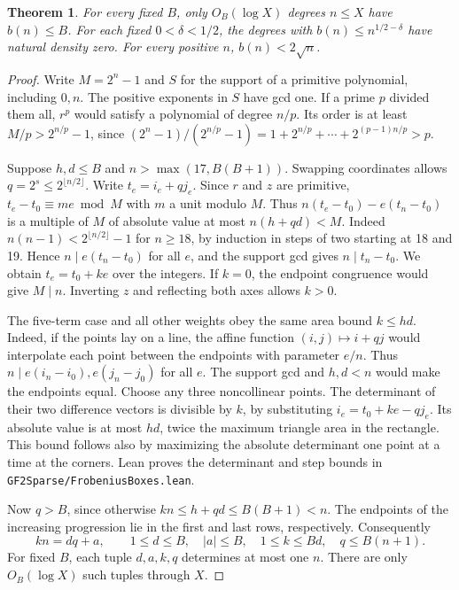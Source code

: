 \documentclass[11pt]{article}
\newtheorem{theorem}{Theorem}
\begin{document}
\begin{theorem}
For every fixed \(B\), only \(O_B(\log X)\) degrees \(n\le X\) have
\(b(n)\le B\). For each fixed \(0<\delta<1/2\), the degrees with
\(b(n)\le n^{1/2-\delta}\) have natural density zero.
For every positive \(n\), \(b(n)<2\sqrt n\).
\end{theorem}
\begin{proof}
Write \(M=2^n-1\) and \(S\) for the support of a primitive polynomial,
including \(0,n\). The positive exponents in \(S\) have gcd one. If a
prime \(p\) divided them all, \(r^p\) would satisfy a polynomial of
degree \(n/p\). Its order is at least \(M/p>2^{n/p}-1\), since
\((2^n-1)/(2^{n/p}-1)=1+2^{n/p}+\cdots+2^{(p-1)n/p}>p\).

Suppose \(h,d\le B\) and \(n>\max(17,B(B+1))\). Swapping coordinates
allows \(q=2^s\le2^{\lfloor n/2\rfloor}\). Write \(t_e=i_e+qj_e\).
Since \(r\) and \(z\) are primitive, \(t_e-t_0\equiv me\bmod M\)
with \(m\) a unit modulo \(M\). Thus \(n(t_e-t_0)-e(t_n-t_0)\)
is a multiple of \(M\) of absolute value at most \(n(h+qd)<M\).
Indeed \(n(n-1)<2^{\lfloor n/2\rfloor}-1\) for \(n\ge18\), by
induction in steps of two starting at 18 and 19. Hence
\(n\mid e(t_n-t_0)\) for all \(e\), and the support gcd gives
\(n\mid t_n-t_0\). We obtain \(t_e=t_0+ke\) over the integers.
If \(k=0\), the endpoint congruence would give \(M\mid n\).
Inverting \(z\) and reflecting both axes allows \(k>0\).

The five-term case and all other weights obey the same area bound
\(k\le hd\). Indeed, if the points lay on a line, the affine function
\((i,j)\mapsto i+qj\) would interpolate each point between the endpoints
with parameter \(e/n\). Thus \(n\mid e(i_n-i_0),e(j_n-j_0)\) for all
\(e\). The support gcd and \(h,d<n\) would make the endpoints equal.
Choose any three noncollinear points. The determinant of their two
difference vectors is divisible by \(k\), by substituting
\(i_e=t_0+ke-qj_e\). Its absolute value is at most \(hd\), twice the
maximum triangle area in the rectangle. This bound follows also by
maximizing the absolute determinant one point at a time at the corners.
Lean proves the determinant and step bounds in
\nolinkurl{GF2Sparse/FrobeniusBoxes.lean}.

Now \(q>B\), since otherwise \(kn\le h+qd\le B(B+1)<n\).
The endpoints of the increasing progression lie in the first and last
rows, respectively. Consequently
\[
             kn=dq+a,\qquad 1\le d\le B,\quad |a|\le B,\quad
             1\le k\le Bd,\quad q\le B(n+1).
\]
For fixed \(B\), each tuple \(d,a,k,q\) determines at most one \(n\).
There are only \(O_B(\log X)\) such tuples through \(X\).


\end{proof}
\end{document}
